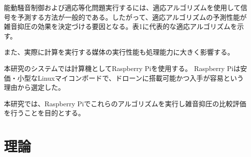 \documentclass[a4paper]{ltjsarticle}
\begin{document}
  能動騒音制御および適応等化問題実行するには、適応アルゴリズムを使用して信号を予測する方法が一般的である。したがって、適応アルゴリズムの予測性能が雑音抑圧の効果を決定づける要因となる。表1に代表的な適応アルゴリズムを示す。

  また、実際に計算を実行する媒体の実行性能も処理能力に大きく影響する。

  本研究のシステムでは計算機としてRaspberry Piを使用する。
  Raspberry Piは安価・小型なLinuxマイコンボードで、ドローンに搭載可能かつ入手が容易という理由から選定した。
  
  本研究では、Raspberry Piでこれらのアルゴリズムを実行し雑音抑圧の比較評価を行うことを目的とする。

  



\section{理論}
\end{document}

